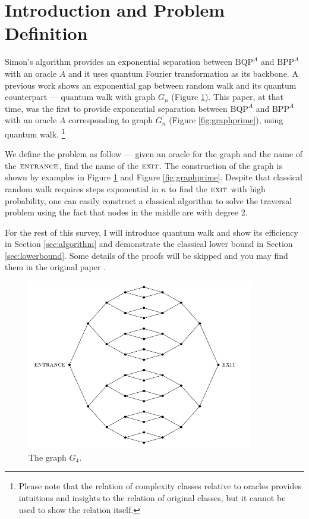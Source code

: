 \documentclass[aps,11pt,twoside,nofootinbib,tightenlines,superscriptaddress,preprintnumbers]{revtex4}
\newcommand{\<}{\langle}
\renewcommand{\>}{\rangle}
\newcommand{\BPP}{{\mathrm{BPP}}}
\newcommand{\BQP}{{\mathrm{BQP}}}
\newcommand{\ent}{{\textsc{entrance}}}
\newcommand{\exit}{{\textsc{exit}}}
\newenvironment{proof sketch}
{\trivlist\item\noindent{\bf Proof sketch}~}
{\qed\endtrivlist}
\begin{document}
\section{Introduction and Problem Definition} \label{sec:intro}
Simon's algorithm \cite{Sim94} provides an exponential separation between $\BQP^{A}$ and $\BPP^{A}$ with an oracle $A$ and it uses quantum Fourier transformation as its backbone. A previous work \cite{FG98} shows an exponential gap between random walk and its quantum counterpart --- quantum walk with graph $G_n$ (Figure \ref{fig:graph}). This paper, at that time, was the first to provide exponential separation between $\BQP^{A}$ and $\BPP^{A}$ with an oracle $A$ corresponding to graph $G^{\prime}_n$ (Figure \ref{fig:graphprime}), using quantum walk. \footnote{Please note that the relation of complexity classes relative to oracles provides intuitions and insights to the relation of original classes, but it cannot be used to show the relation itself.\cite{MITACT16}}

We define the problem as follow --- given an oracle for the graph and the name of the $\ent$, find the name of the $\exit$. The construction of the graph is shown by examples in Figure \ref{fig:graph} and Figure \ref{fig:graphprime}. Despite that classical random walk requires steps exponential in $n$ to find the $\exit$ with high probability, one can easily construct a classical algorithm to solve the traversal problem using the fact that nodes in the middle are with degree $2$.

For the rest of this survey, I will introduce quantum walk and show its efficiency in Section \ref{sec:algorithm} and demonstrate the classical lower bound in Section \ref{sec:lowerbound}. Some details of the proofs will be skipped and you may find them in the original paper \cite{EXP03}.

\begin{figure}
\includegraphics[width=280pt]{basicgraph4}
\caption{The graph $G_4$.}
\label{fig:graph}
\end{figure}
\end{document}
